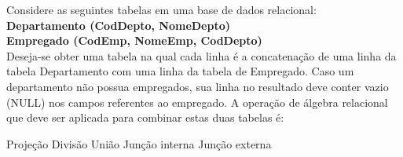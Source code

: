 \documentclass[12pt, addpoints]{exam}
\begin{document}
\begin{questions}
\question

Considere as seguintes tabelas em uma base de dados relacional:\\

\textbf{Departamento (CodDepto, NomeDepto)}\\

\textbf{Empregado (CodEmp, NomeEmp, CodDepto)}\\

Deseja-se obter uma tabela na qual cada linha é a concatenação de uma linha da tabela Departamento com uma linha da tabela de Empregado. Caso um departamento não possua empregados, sua linha no resultado deve conter vazio (NULL) nos campos referentes ao empregado. A operação de álgebra relacional que deve ser aplicada para combinar estas duas tabelas é:
\begin{choices}
\choice Projeção
\choice Divisão
\choice União
\choice Junção interna
\choice Junção externa
\end{choices}



    \end{questions}
    
\end{document}
